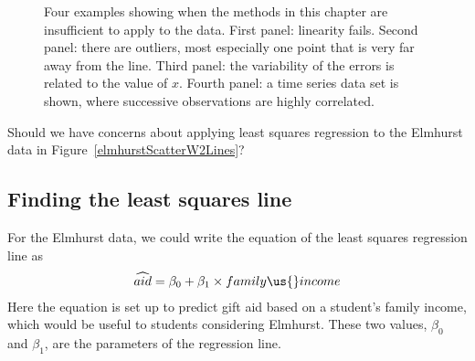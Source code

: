 \begin{figure}[h]
  \centering
  \caption{Four examples showing when the methods in this
      chapter are insufficient to apply to the data.
      First panel: linearity fails.
      Second panel: there are outliers, most especially
      one point that is very far away from the line.
      Third panel: the variability of the errors is related
      to the value of $x$.
      Fourth panel: a time series data set is shown,
      where successive observations are highly correlated.}
  \label{whatCanGoWrongWithLinearModel}
\end{figure}

\begin{exercisewrap}
\begin{nexercise}
Should we have concerns about applying least squares regression to the Elmhurst data in Figure~\ref{elmhurstScatterW2Lines}?\footnotemark
\end{nexercise}
\end{exercisewrap}


\subsection{Finding the least squares line}
\label{findingTheLeastSquaresLineSection}

For the Elmhurst data, we could write the equation of the least squares regression line as
\begin{eqnarray*}
\widehat{aid} = \beta_0 + \beta_{1}\times family\us{}income
\end{eqnarray*}
Here the equation is set up to predict gift aid based on a student's family income, which would be useful to students considering Elmhurst. These two values, $\beta_0$ and $\beta_1$, are the parameters of the regression line.

